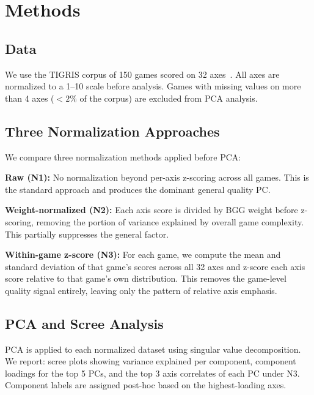 \section{Methods}
\label{sec:method}

\subsection{Data}

We use the TIGRIS corpus of 150 games scored on 32 axes~\cite{dellaLibera2026corpus}.
All axes are normalized to a 1--10 scale before analysis. Games with missing values
on more than 4 axes ($< 2\%$ of the corpus) are excluded from PCA analysis.

\subsection{Three Normalization Approaches}

We compare three normalization methods applied before PCA:

\textbf{Raw (N1):} No normalization beyond per-axis z-scoring across all games.
This is the standard approach and produces the dominant general quality PC.

\textbf{Weight-normalized (N2):} Each axis score is divided by BGG weight before
z-scoring, removing the portion of variance explained by overall game complexity.
This partially suppresses the general factor.

\textbf{Within-game z-score (N3):} For each game, we compute the mean and standard
deviation of that game's scores across all 32 axes and z-score each axis score
relative to that game's own distribution. This removes the game-level quality signal
entirely, leaving only the pattern of relative axis emphasis.

\subsection{PCA and Scree Analysis}

PCA is applied to each normalized dataset using singular value decomposition.
We report: scree plots showing variance explained per component, component loadings
for the top 5 PCs, and the top 3 axis correlates of each PC under N3.
Component labels are assigned post-hoc based on the highest-loading axes.
